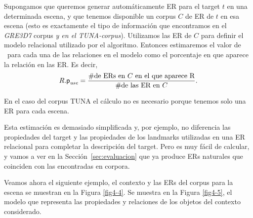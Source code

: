 Supongamos que queremos generar autom\'aticamente ER para el target $t$ en una
determinada escena, y que tenemos disponible un corpus $C$ de ER de $t$
en esa escena (esto es exactamente el tipo de informaci\'on que encontramos en el
\textit{GRE3D7} corpus \textit{y en el TUNA-corpus}). Utilizamos las ER de $C$
para definir el modelo relacional utilizado por el algoritmo. Entonces 
estimaremos el valor de \puse\ para cada una de las relaciones en el modelo como el
porcentaje en que aparece la relaci\'on en las ER. Es decir,
\begin{equation} \label{eq1}
R.\textsf{p}_\textit{use} = \frac {\#\mbox{de ERs en $C$ en el que aparece R}} {\#\mbox{de las ER en $C$}}.
\end{equation}

En el caso del corpus TUNA el c\'alculo no es necesario
porque tenemos solo una ER para cada escena.

Esta estimaci\'on es demasiado simplificada y, por ejemplo, no 
diferencia las propiedades del target y las propiedades de
los landmarks utilizadas en una ER relacional para completar la descripci\'on
del target. Pero es muy f\'acil de calcular, y vamos a ver
en la Secci\'on~\ref{sec:evaluacion} que ya produce ERs naturales
que coinciden con las encontradas en corpora.

Veamos ahora el siguiente ejemplo, el contexto y las ERs del corpus para la escena se muestran en la Figura \ref{fig4-4}. Se muestra en la Figura \ref{fig4-5}, el modelo que representa 
las propiedades y relaciones de los objetos del contexto considerado.

